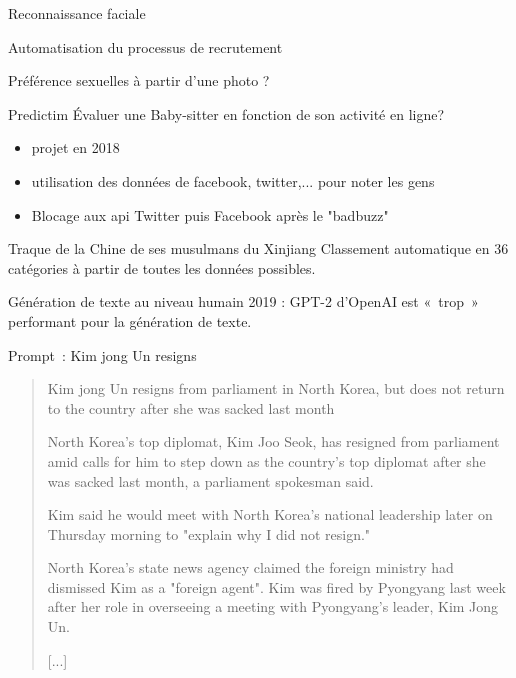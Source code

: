 \begin{frame}{Reconnaissance faciale}
\end{frame}

\begin{frame}{Automatisation du processus de recrutement}
\end{frame}

\begin{frame}{Préférence sexuelles à partir d'une photo ?}
\end{frame}

\begin{frame}{Predictim}
  Évaluer une Baby-sitter en fonction de son activité en ligne?
  \begin{itemize}
    \item projet en 2018
    \item utilisation des données de facebook, twitter,... pour noter les gens
    \item Blocage aux api Twitter puis Facebook après le "badbuzz"
  \end{itemize}
\end{frame}

\begin{frame}{Traque de la Chine de ses musulmans du Xinjiang}
  Classement automatique en 36 catégories à partir de toutes les données possibles.

\end{frame}

\begin{frame}{Génération de texte au niveau humain}
  2019 : GPT-2 d'OpenAI est «~trop~» performant pour la génération de texte.

  Prompt~: Kim jong Un resigns
  \begin{quote}
    Kim jong Un resigns from parliament in North Korea, but does not return to the country after she was sacked last month
      
    North Korea's top diplomat, Kim Joo Seok, has resigned from parliament amid calls for him to step down as the country's top diplomat after she was sacked last month, a parliament spokesman said.
    
    Kim said he would meet with North Korea's national leadership later on Thursday morning to "explain why I did not resign."
    
    North Korea's state news agency claimed the foreign ministry had dismissed Kim as a "foreign agent". Kim was fired by Pyongyang last week after her role in overseeing a meeting with Pyongyang's leader, Kim Jong Un. 
    
    [...]
  \end{quote}
\end{frame}

